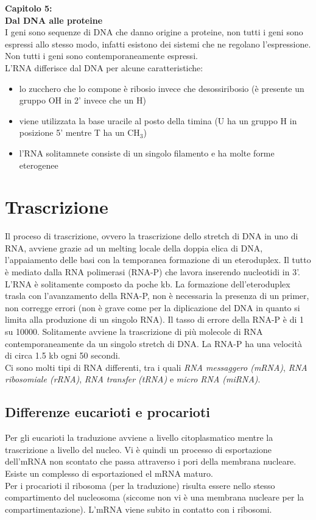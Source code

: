 \Large\textbf{Capitolo 5: \\Dal DNA alle proteine}\\

\small
I geni sono sequenze di DNA che danno origine a proteine, non tutti i geni sono espressi allo stesso modo, infatti esistono dei sistemi che ne regolano l'espressione. 
Non tutti i geni sono contemporaneamente espressi.\\
L'RNA differisce dal DNA per alcune caratteristiche:
\begin{itemize}
    \item lo zucchero che lo compone è ribosio invece che desossiribosio (è presente un gruppo OH in 2' invece che un H)
    \item viene utilizzata la base uracile al posto della timina (U ha un gruppo H in posizione 5' mentre T ha un CH$_ {3}$)
    \item l'RNA solitamnete consiste di un singolo filamento e ha molte forme eterogenee
\end{itemize}

\section{Trascrizione}
    Il proceso di trascrizione, ovvero la trascrizione dello stretch di DNA in uno di RNA, avviene grazie ad un melting locale della doppia elica di DNA, l'appaiamento delle basi con la temporanea formazione di un eteroduplex. Il tutto è mediato dalla RNA polimerasi (RNA-P) che lavora inserendo nucleotidi in 3'.\\
    L'RNA è solitamente composto da poche kb. La formazione dell'eteroduplex trasla con l'avanzamento della RNA-P, non è necessaria la presenza di un primer, non corregge errori (non è grave come per la diplicazione del DNA in quanto si limita alla produzione di un singolo RNA). 
    Il tasso di errore della RNA-P è di 1 su 10000.
    Solitamente avviene la trascrizione di più molecole di RNA contemporaneamente da un singolo stretch di DNA. La RNA-P ha una velocità di circa 1.5 kb ogni 50 secondi.\\
    Ci sono molti tipi di RNA differenti, tra i quali \textit{RNA messaggero (mRNA)}, \textit{RNA ribosomiale (rRNA)}, \textit{RNA transfer (tRNA)} e \textit{micro RNA (miRNA)}.
    
    \subsection{Differenze eucarioti e procarioti}
        Per gli eucarioti la traduzione avviene a livello citoplasmatico mentre la trascrizione a livello del nucleo. Vi è quindi un processo di esportazione dell'mRNA non scontato che passa attraverso i pori della membrana nucleare. Esiste un complesso di esportazioned el mRNA maturo.\\
        Per i procarioti il ribosoma (per la traduzione) risulta essere nello stesso compartimento del nucleosoma (siccome non vi è una membrana nucleare per la compartimentazione). L'mRNA viene subito in contatto con i ribosomi.
        
